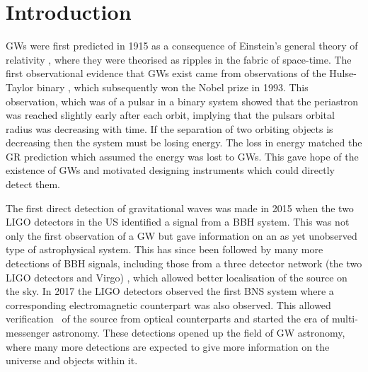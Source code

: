 \chapter{\label{intro}Introduction}


\Glspl{GW} were first predicted in 1915 as a consequence of Einstein's general
theory of relativity \citep{einstein2005GrundlageAllgemeinen}, where they were
theorised as ripples in the fabric of space-time.  The first observational
evidence that \glspl{GW} exist came from observations of the Hulse-Taylor
binary \citep{weisberg1981GravitationalWaves,weisberg2004RelativisticBinary}, which subsequently won the Nobel prize in 1993.
This observation, which was of a pulsar in a binary system showed that the periastron was
reached slightly early after each orbit, implying that the pulsars orbital radius was
decreasing with time.  If the separation of two orbiting objects is decreasing
then the system must be losing energy.  The loss in energy matched the \gls{GR}
prediction which assumed the energy was lost to \glspl{GW}.  This gave hope of
the existence of \glspl{GW} and motivated designing instruments
which could directly detect them.~ 

The first direct detection of gravitational
waves was made in 2015 when the two \gls{LIGO} detectors in the US
\citep{abbott2016ObservationGravitational} identified a signal from a \gls{BBH}
system.  This was not only the first observation of a \gls{GW} but gave
information on an as yet unobserved type of astrophysical
system.  This has since been followed by many more detections of \gls{BBH}
signals, including those from a three detector network (the two \gls{LIGO} detectors and Virgo)
\citep{abbott2017GW170814ThreeDetector,theligoscientificcollaboration2020GW190425Observation}, which allowed better localisation of the source on the sky.  
In 2017 the \gls{LIGO} detectors observed the
first \gls{BNS} system \citep{abbott2017GW170817Observation} where a
corresponding electromagnetic counterpart was also observed.
This allowed verification~ of the source from optical counterparts and started the era of
multi-messenger astronomy.  These detections opened up the field of
\gls{GW} astronomy, where many more detections are expected to give more
information on the universe and objects within it.

